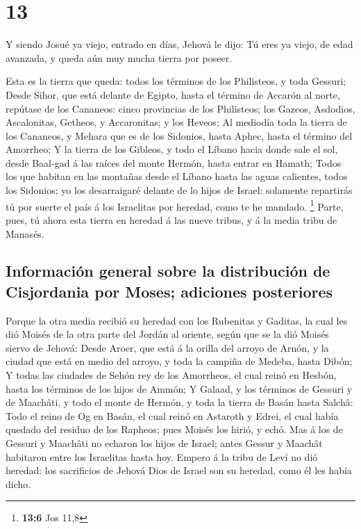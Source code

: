 \hypertarget{section-12}{%
\section{13}\label{section-12}}

 Y siendo Josué ya viejo, entrado en días, Jehová le dijo:
Tú eres ya viejo, de edad avanzada, y queda aún muy mucha tierra por
poseer.

 Esta es la tierra que queda: todos los términos de los
Philisteos, y toda Gessuri;  Desde Sihor, que está delante
de Egipto, hasta el término de Accarón al norte, repútase de los
Cananeos: cinco provincias de los Philisteos; los Gazeos, Asdodios,
Ascalonitas, Getheos, y Accaronitas; y los Heveos;  Al
mediodía toda la tierra de los Cananeos, y Mehara que es de los
Sidonios, hasta Aphec, hasta el término del Amorrheo;  Y
la tierra de los Gibleos, y todo el Líbano hacia donde sale el sol,
desde Baal-gad á las raíces del monte Hermón, hasta entrar en Hamath;
 Todos los que habitan en las montañas desde el Líbano
hasta las aguas calientes, todos los Sidonios; yo los desarraigaré
delante de lo hijos de Israel: solamente repartirás tú por suerte el
país á los Israelitas por heredad, como te he mandado. \footnote{\textbf{13:6}
  Jos 11,8}  Parte, pues, tú ahora esta tierra en heredad
á las nueve tribus, y á la media tribu de Manasés.

\hypertarget{informaciuxf3n-general-sobre-la-distribuciuxf3n-de-cisjordania-por-moses-adiciones-posteriores}{%
\subsection{Información general sobre la distribución de Cisjordania por
Moses; adiciones
posteriores}\label{informaciuxf3n-general-sobre-la-distribuciuxf3n-de-cisjordania-por-moses-adiciones-posteriores}}

 Porque la otra media recibió su heredad con los Rubenitas
y Gaditas, la cual les dió Moisés de la otra parte del Jordán al
oriente, según que se la dió Moisés siervo de Jehová: 
Desde Aroer, que está á la orilla del arroyo de Arnón, y la ciudad que
está en medio del arroyo, y toda la campiña de Medeba, hasta Dibón;
 Y todas las ciudades de Sehón rey de los Amorrheos, el
cual reinó en Hesbón, hasta los términos de los hijos de Ammón;
 Y Galaad, y los términos de Gessuri y de Maachâti, y
todo el monte de Hermón, y toda la tierra de Basán hasta Salchâ:
 Todo el reino de Og en Basán, el cual reinó en Astaroth
y Edrei, el cual había quedado del residuo de los Rapheos; pues Moisés
los hirió, y echó.  Mas á los de Gessuri y Maachâti no
echaron los hijos de Israel; antes Gessur y Maachât habitaron entre los
Israelitas hasta hoy.  Empero á la tribu de Leví no dió
heredad: los sacrificios de Jehová Dios de Israel son su heredad, como
él les había dicho.

